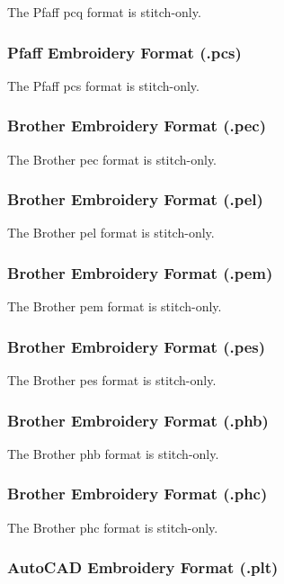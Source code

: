 \documentclass[a4paper, 11pt]{report}
\begin{document}
The Pfaff pcq format is stitch-only.

\subsubsection{Pfaff Embroidery Format (.pcs)}

The Pfaff pcs format is stitch-only.

\subsubsection{Brother Embroidery Format (.pec)}

The Brother pec format is stitch-only.

\subsubsection{Brother Embroidery Format (.pel)}

The Brother pel format is stitch-only.

\subsubsection{Brother Embroidery Format (.pem)}

The Brother pem format is stitch-only.

\subsubsection{Brother Embroidery Format (.pes)}

The Brother pes format is stitch-only.

\subsubsection{Brother Embroidery Format (.phb)}

The Brother phb format is stitch-only.

\subsubsection{Brother Embroidery Format (.phc)}

The Brother phc format is stitch-only.

\subsubsection{AutoCAD Embroidery Format (.plt)}
\end{document}
